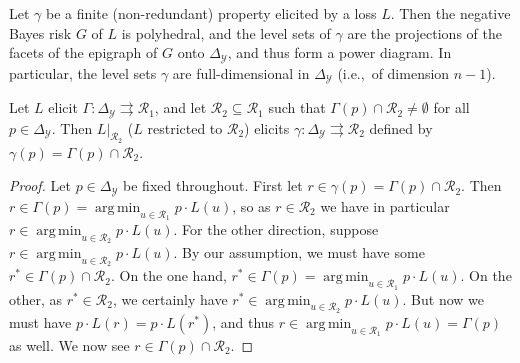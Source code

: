 \documentclass[anon,12pt]{colt2019}
\newcommand{\simplex}{\Delta_\Y}
\newcommand{\R}{\mathcal{R}}
\newcommand{\Y}{\mathcal{Y}}
\newcommand{\toto}{\rightrightarrows}
\DeclareMathOperator*{\argmin}{arg\,min}
\begin{document}
\begin{lemma}\label{lem:finite-full-dim}
  Let $\gamma$ be a finite (non-redundant) property elicited by a loss $L$.
  Then the negative Bayes risk $G$ of $L$ is polyhedral, and the level sets of $\gamma$ are the projections of the facets of the epigraph of $G$ onto $\simplex$, and thus form a power diagram.
  In particular, the level sets $\gamma$ are full-dimensional in $\simplex$ (i.e.,\ of dimension $n-1$).
\end{lemma}

\begin{lemma}\label{lem:loss-restrict}
  Let $L$ elicit $\Gamma:\simplex\toto\R_1$, and let $\R_2\subseteq\R_1$ such that $\Gamma(p) \cap \R_2 \neq \emptyset$ for all $p\in\simplex$.
  Then $L|_{\R_2}$ ($L$ restricted to $\R_2$) elicits $\gamma:\simplex\toto\R_2$ defined by $\gamma(p) = \Gamma(p)\cap \R_2$.
\end{lemma}
\begin{proof}
  Let $p\in\simplex$ be fixed throughout.
  First let $r \in \gamma(p) = \Gamma(p) \cap \R_2$.
  Then $r \in \Gamma(p) = \argmin_{u\in\R_1} p\cdot L(u)$, so as $r\in\R_2$ we have in particular $r \in \argmin_{u\in\R_2} p\cdot L(u)$.
  For the other direction, suppose $r \in \argmin_{u\in\R_2} p\cdot L(u)$.
  By our assumption, we must have some $r^* \in \Gamma(p) \cap \R_2$.
  On the one hand, $r^*\in\Gamma(p) = \argmin_{u\in\R_1} p\cdot L(u)$.
  On the other, as $r^* \in \R_2$, we certainly have $r^* \in \argmin_{u\in\R_2} p\cdot L(u)$.
  But now we must have $p\cdot L(r) = p\cdot L(r^*)$, and thus $r \in \argmin_{u\in\R_1} p\cdot L(u) = \Gamma(p)$ as well.
  We now see $r \in \Gamma(p) \cap \R_2$.
\end{proof}
\end{document}
